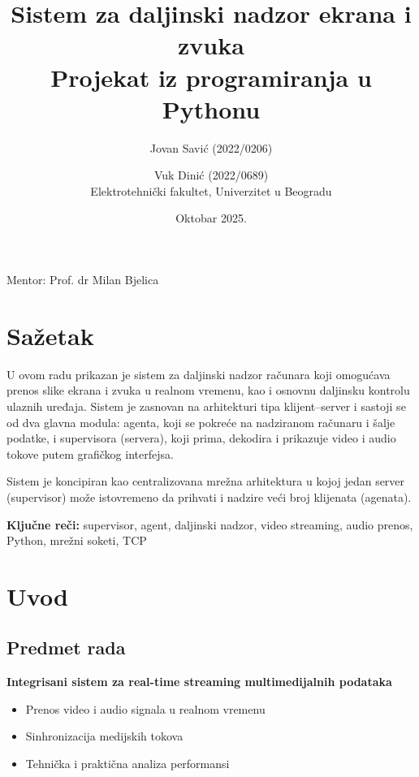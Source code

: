 \documentclass[a4paper,12pt]{article}
\title{\textbf{Sistem za daljinski nadzor ekrana i zvuka}\\[0.5em]
\large Projekat iz programiranja u Pythonu}
\author{Jovan Savić (2022/0206) \and Vuk Dinić (2022/0689)\\[0.5em]
Elektrotehnički fakultet, Univerzitet u Beogradu}
\date{Oktobar 2025.}
\begin{document}
\maketitle

\thispagestyle{empty} %
\vfill
\begin{center}
Mentor: Prof. dr Milan Bjelica

\newpage
\section*{Sažetak}

U ovom radu prikazan je sistem za daljinski nadzor računara koji omogućava prenos slike ekrana i zvuka u realnom vremenu, kao i osnovnu daljinsku kontrolu ulaznih uređaja. Sistem je zasnovan na arhitekturi tipa klijent–server i sastoji se od dva glavna modula: agenta, koji se pokreće na nadziranom računaru i šalje podatke, i supervisora (servera), koji prima, dekodira i prikazuje video i audio tokove putem grafičkog interfejsa.  

Sistem je koncipiran kao centralizovana mrežna arhitektura u kojoj jedan server (supervisor) može istovremeno da prihvati i nadzire veći broj klijenata (agenata).

\vspace{1cm}
\begin{center}
\textbf{Ključne reči:} supervisor, agent, daljinski nadzor, video streaming, audio prenos, Python, mrežni soketi, TCP
\end{center}
\end{center}
\newpage
\tableofcontents
\thispagestyle{plain}
\newpage

\section{Uvod}

\subsection{Predmet rada}

\textbf{Integrisani sistem za real-time streaming multimedijalnih podataka}
\begin{itemize}
    \item Prenos video i audio signala u realnom vremenu
    \item Sinhronizacija medijskih tokova
    \item Tehnička i praktična analiza performansi
\end{itemize}
\end{document}
